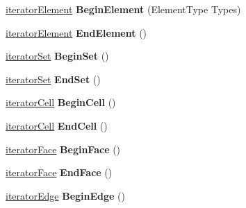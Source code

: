 \begin{DoxyCompactItemize}
\item 
\hypertarget{classINMOST_1_1Mesh_a5885febfabd0c64ca2147f2508c676ae}{\hyperlink{classINMOST_1_1Mesh_1_1base__iterator}{iterator\-Element} {\bfseries Begin\-Element} (Element\-Type Types)}\label{classINMOST_1_1Mesh_a5885febfabd0c64ca2147f2508c676ae}

\item 
\hypertarget{classINMOST_1_1Mesh_a7ceafaeeef67b517d363d19249c9aae7}{\hyperlink{classINMOST_1_1Mesh_1_1base__iterator}{iterator\-Element} {\bfseries End\-Element} ()}\label{classINMOST_1_1Mesh_a7ceafaeeef67b517d363d19249c9aae7}

\item 
\hypertarget{classINMOST_1_1Mesh_aa5e1a950b5a5f7ad600d55226023b7c9}{\hyperlink{classINMOST_1_1Mesh_1_1base__iterator}{iterator\-Set} {\bfseries Begin\-Set} ()}\label{classINMOST_1_1Mesh_aa5e1a950b5a5f7ad600d55226023b7c9}

\item 
\hypertarget{classINMOST_1_1Mesh_a00f6929baaaf379644dddef6c42fef76}{\hyperlink{classINMOST_1_1Mesh_1_1base__iterator}{iterator\-Set} {\bfseries End\-Set} ()}\label{classINMOST_1_1Mesh_a00f6929baaaf379644dddef6c42fef76}

\item 
\hypertarget{classINMOST_1_1Mesh_a0c7a5c1d76ed3816d0167adac44d0a24}{\hyperlink{classINMOST_1_1Mesh_1_1base__iterator}{iterator\-Cell} {\bfseries Begin\-Cell} ()}\label{classINMOST_1_1Mesh_a0c7a5c1d76ed3816d0167adac44d0a24}

\item 
\hypertarget{classINMOST_1_1Mesh_ad00d0cd949a89a3bf9ff0802d5292e82}{\hyperlink{classINMOST_1_1Mesh_1_1base__iterator}{iterator\-Cell} {\bfseries End\-Cell} ()}\label{classINMOST_1_1Mesh_ad00d0cd949a89a3bf9ff0802d5292e82}

\item 
\hypertarget{classINMOST_1_1Mesh_a8b92935c9e005193abf21f24f701fa07}{\hyperlink{classINMOST_1_1Mesh_1_1base__iterator}{iterator\-Face} {\bfseries Begin\-Face} ()}\label{classINMOST_1_1Mesh_a8b92935c9e005193abf21f24f701fa07}

\item 
\hypertarget{classINMOST_1_1Mesh_a5324c63941c77b2fc4654e5c2774b845}{\hyperlink{classINMOST_1_1Mesh_1_1base__iterator}{iterator\-Face} {\bfseries End\-Face} ()}\label{classINMOST_1_1Mesh_a5324c63941c77b2fc4654e5c2774b845}

\item 
\hypertarget{classINMOST_1_1Mesh_a5215f1e7a43a336c68819a92780b89d5}{\hyperlink{classINMOST_1_1Mesh_1_1base__iterator}{iterator\-Edge} {\bfseries Begin\-Edge} ()}\label{classINMOST_1_1Mesh_a5215f1e7a43a336c68819a92780b89d5}


\end{DoxyCompactItemize}
